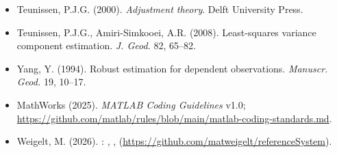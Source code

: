 \begin{itemize}
\item Teunissen, P.J.G. (2000). \emph{Adjustment theory}. Delft University Press.
\item Teunissen, P.J.G., Amiri-Simkooei, A.R. (2008). Least-squares variance component estimation. \emph{J. Geod.} 82, 65--82.
\item Yang, Y. (1994). Robust estimation for dependent observations. \emph{Manuscr. Geod.} 19, 10--17.
\item MathWorks (2025). \emph{MATLAB Coding Guidelines} v1.0; \url{https://github.com/matlab/rules/blob/main/matlab-coding-standards.md}.
\item Weigelt, M. (2026). : , ,  (\url{https://github.com/matweigelt/referenceSystem}).
\end{itemize}
